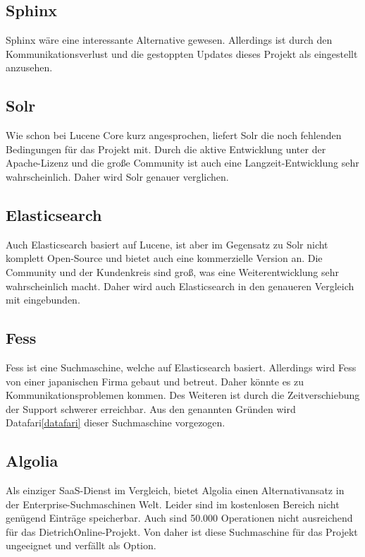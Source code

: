 \subsection{Sphinx}

Sphinx wäre eine interessante Alternative gewesen. Allerdings ist durch den Kommunikationsverlust und die gestoppten Updates dieses Projekt als eingestellt anzusehen. \cite{SphinxTechnologiesInc.2019}

\subsection{Solr}

Wie schon bei Lucene Core kurz angesprochen, liefert Solr die noch fehlenden Bedingungen für das Projekt mit. Durch die aktive Entwicklung unter der Apache-Lizenz und die große Community ist auch eine Langzeit-Entwicklung sehr wahrscheinlich. Daher wird Solr genauer verglichen. \cite{TheApacheSoftwareFoundation.2019}

\subsection{Elasticsearch}

Auch Elasticsearch basiert auf Lucene, ist aber im Gegensatz zu Solr nicht komplett Open-Source und bietet auch eine kommerzielle Version an. Die Community und der Kundenkreis sind groß, was eine Weiterentwicklung sehr wahrscheinlich macht. Daher wird auch Elasticsearch in den genaueren Vergleich mit eingebunden. \cite{Elasticsearch.2019}

\subsection{Fess}

Fess ist eine Suchmaschine, welche auf Elasticsearch basiert. Allerdings wird Fess von einer japanischen Firma gebaut und betreut. Daher könnte es zu Kommunikationsproblemen kommen. Des Weiteren ist durch die Zeitverschiebung der Support schwerer erreichbar. Aus den genannten Gründen wird Datafari\ref{datafari} dieser Suchmaschine vorgezogen. \cite{CodeLibs.2019}

\subsection{Algolia}

Als einziger SaaS-Dienst im Vergleich, bietet Algolia einen Alternativansatz in der Enterprise-Suchmaschinen Welt. Leider sind im kostenlosen Bereich nicht genügend Einträge speicherbar. Auch sind 50.000 Operationen nicht ausreichend für das DietrichOnline-Projekt. Von daher ist diese Suchmaschine für das Projekt ungeeignet und verfällt als Option. \cite{Algolia.2019}

